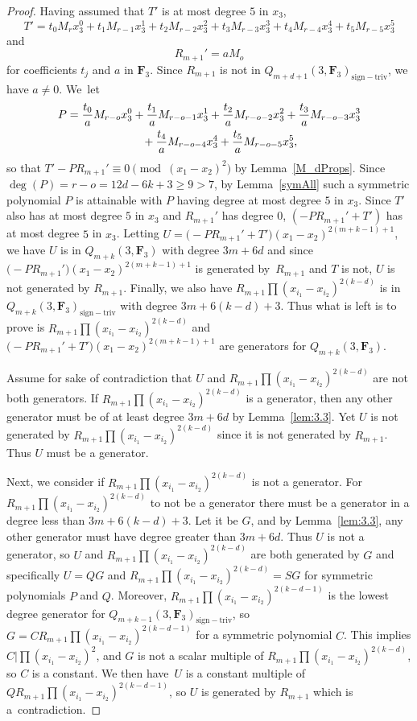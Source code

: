 \documentclass[11pt]{article}
\numberwithin{equation}{section}
\theoremstyle{definition}
\numberwithin{equation}{section}
\newcommand{\siv}{\mathrm{sign-triv}}
\begin{document}
\begin{proof}
 Having assumed that $T'$ is at most degree $5$ in $x_3$,
 \[T' = t_0M_rx_3^0+t_1M_{r-1}x_3^1+t_2M_{r-2}x_3^2+t_3M_{r-3}x_3^3+t_4M_{r-4}x_3^4+t_5M_{r-5}x_3^5\]
 and
 \[R_{m+1}'=aM_{o}\]
 for coefficients $t_j$ and $a$ in $\mathbf{F}_3$. Since $R_{m+1}$ is not in $Q_{m+d+1}(3,\mathbf{F}_3)_{\siv}$, we have $a\neq 0$. We~let
 \begin{gather*}
 P = \frac{t_0}{a}M_{r-o}x_3^0+\frac{t_1}{a}M_{r-o-1}x_3^1+\frac{t_2}{a}M_{r-o-2}x_3^2+\frac{t_3}{a}M_{r-o-3}x_3^3\\
 \hphantom{P =}{}
 +\frac{t_4}{a}M_{r-o-4}x_3^4+\frac{t_5}{a}M_{r-o-5}x_3^5,
 \end{gather*}
 so that $T'-PR_{m+1}'\equiv 0\pmod{(x_1-x_2)^2}$ by Lemma~\ref{M_dProps}. Since $\deg(P) = r-o = 12d-6k+3\geq 9>7$, by Lemma~\ref{symAll} such a symmetric polynomial $P$ is attainable with $P$ having degree at most degree $5$ in $x_3$.
 Since $T'$ also has at most degree $5$ in $x_3$ and $R_{m+1}'$ has degree $0$, $(-PR_{m+1}'+T')$ has at most degree $5$ in $x_3$. Letting $U=\bigl(-PR_{m+1}'+T'\bigr)(x_1-x_2)^{2(m+k-1)+1}$, we have $U$ is in $Q_{m+k}(3,\mathbf{F}_3)$ with degree $3m+6d$ and since $\bigl(-PR_{m+1}'\bigr)(x_1-x_2)^{2(m+k-1)+1}$ is generated by~$R_{m+1}$ and $T$ is not, $U$ is not generated by $R_{m+1}$. Finally, we also have $R_{m+1}\prod (x_{i_1}-x_{i_2})^{2(k-d)}$ is in $Q_{m+k}(3,\mathbf{F}_3)_{\siv}$ with degree $3m+6(k-d)+3$. Thus what is left is to prove is $R_{m+1}\prod (x_{i_1}-x_{i_2})^{2(k-d)}$ and $\bigl(-PR_{m+1}'+T'\bigr)(x_1-x_2)^{2(m+k-1)+1}$ are generators for $Q_{m+k}(3,\mathbf{F}_3)$.

 Assume for sake of contradiction that $U$ and $R_{m+1}\prod (x_{i_1}-x_{i_2})^{2(k-d)}$ are not both generators. If $R_{m+1}\prod (x_{i_1}-x_{i_2})^{2(k-d)}$ is a generator, then any other generator must be of at least degree $3m+6d$ by Lemma~\ref{lem:3.3}. Yet $U$ is not generated by $R_{m+1}\prod (x_{i_1}-x_{i_2})^{2(k-d)}$ since it is not generated by $R_{m+1}$. Thus $U$ must be a generator.

 Next, we consider if $R_{m+1}\prod (x_{i_1}-x_{i_2})^{2(k-d)}$ is not a generator. For $R_{m+1}\prod (x_{i_1}-x_{i_2})^{2(k-d)}$ to not be a generator there must be a generator in a degree less than $3m+6(k-d)+3$. Let it be $G$, and by Lemma~\ref{lem:3.3}, any other generator must have degree greater than $3m+6d$. Thus $U$ is not a generator, so $U$ and $R_{m+1}\prod (x_{i_1}-x_{i_2})^{2(k-d)}$ are both generated by $G$ and specifically $U=QG$ and $R_{m+1}\prod (x_{i_1}-x_{i_2})^{2(k-d)}=SG$ for symmetric polynomials $P$ and $Q$. Moreover, $R_{m+1}\prod (x_{i_1}-x_{i_2})^{2(k-d-1)}$ is the lowest degree generator for $Q_{m+k-1}(3,\mathbf{F}_3)_{\siv}$, so $G=CR_{m+1}\prod (x_{i_1}-x_{i_2})^{2(k-d-1)}$ for a symmetric polynomial $C$. This implies $C|\prod(x_{i_1}-x_{i_2})^2$, and $G$ is not a scalar multiple of $R_{m+1}\prod (x_{i_1}-x_{i_2})^{2(k-d)}$, so $C$ is a constant. We then have~$U$ is a constant multiple of $QR_{m+1}\prod (x_{i_1}-x_{i_2})^{2(k-d-1)}$, so $U$ is generated by $R_{m+1}$ which is a~contradiction.


\end{proof}
\end{document}

